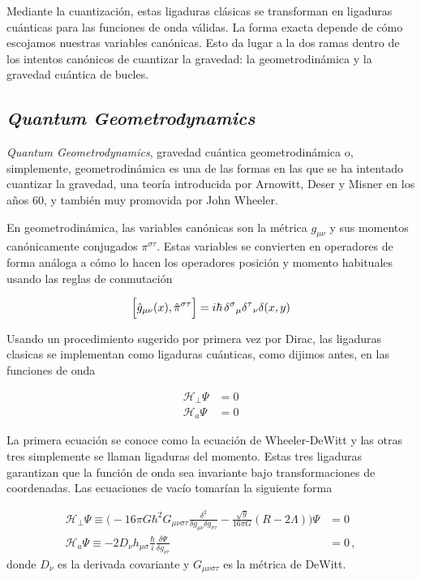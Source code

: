 \documentclass[11pt,a4paper,titlepage]{article}
\begin{document}
Mediante la cuantización, estas ligaduras clásicas se transforman en ligaduras cuánticas para las funciones de onda válidas. La forma exacta depende de cómo escojamos nuestras variables canónicas. Esto da lugar a la dos ramas dentro de los intentos canónicos de cuantizar la gravedad: la geometrodinámica y la gravedad cuántica de bucles.


\subsection{\textit{Quantum Geometrodynamics}}

\textit{Quantum Geometrodynamics}, gravedad cuántica geometrodinámica o, simplemente, geometrodinámica es una de las formas en las que se ha intentado cuantizar la gravedad, una teoría introducida por Arnowitt, Deser y Misner en los años 60, y también muy promovida por John Wheeler.

En geometrodinámica, las variables canónicas son la métrica $g_{\mu\nu}$ y sus momentos canónicamente conjugados $\pi^{\sigma\tau}$. Estas variables se convierten en operadores de forma análoga a cómo lo hacen los operadores posición y momento habituales usando las reglas de conmutación

\begin{equation*}
 \Big[\hat{g}_{\mu\nu}(x),\hat{\pi}^{\sigma\tau}\Big]=i\hbar\,\tensor{\delta}{^\sigma}{_\mu}\tensor{\delta}{^\tau}{_\nu}\delta(x,y)
\end{equation*}

Usando un procedimiento sugerido por primera vez por Dirac, las ligaduras clasicas se implementan como ligaduras cuánticas, como dijimos antes, en las funciones de onda

\begin{align*}
 \mathscr{H}_\perp\Psi&=0\\
 \mathscr{H}_a\Psi&=0
\end{align*}

La primera ecuación se conoce como la ecuación de Wheeler-DeWitt y las otras tres simplemente se llaman ligaduras del momento. Estas tres ligaduras garantizan que la función de onda sea invariante bajo transformaciones de coordenadas. Las ecuaciones de vacío tomarían la siguiente forma

\begin{align*}
  \mathscr{H}_\perp\Psi\equiv\Big(-16\pi G\hbar^2G_{\mu\nu\sigma\tau}\frac{\delta^2}{\delta g_{\mu\nu}\delta g_{\sigma\tau}}-\frac{\sqrt{g}}{16\pi G}(R-2\Lambda)\Big)\Psi&=0\\
 \mathscr{H}_a\Psi\equiv-2D_\nu h_{\mu\sigma}\frac{\hbar}{i}\frac{\delta\Psi}{\delta g_{\nu\tau}}&=0\,,
\end{align*}
donde $D_\nu$ es la derivada covariante y $G_{\mu\nu\sigma\tau}$ es la métrica de DeWitt.
\end{document}
